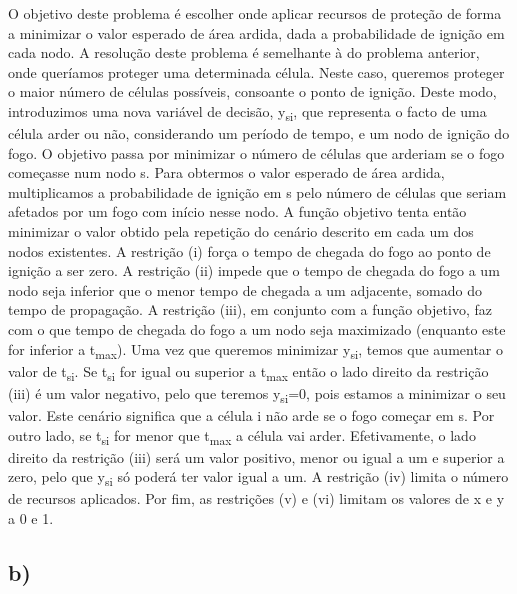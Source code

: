 \documentclass[11pt]{article} %
\begin{document}
O objetivo deste problema é escolher onde aplicar recursos de proteção de forma a minimizar o valor esperado de área ardida, dada a probabilidade de ignição em cada nodo. A resolução deste problema é semelhante à do problema anterior, onde queríamos proteger uma determinada célula. Neste caso, queremos proteger o maior número de células possíveis, consoante o ponto de ignição. Deste modo, introduzimos uma nova variável de decisão, y\textsubscript{si}, que representa o facto de uma célula arder ou não, considerando um período de tempo, e um nodo de ignição do fogo. O objetivo passa por minimizar  o número de células que arderiam se o fogo começasse num nodo s.
Para obtermos o valor esperado de área ardida, multiplicamos a probabilidade de ignição em s pelo número de células que seriam afetados por um fogo com início nesse nodo. A função objetivo tenta então minimizar o valor obtido pela repetição do cenário descrito em cada um dos nodos existentes. A restrição (i) força o tempo de chegada do fogo ao ponto de ignição a ser zero. A restrição (ii) impede que o tempo de chegada do fogo a um nodo seja inferior que o menor tempo de chegada a um adjacente, somado do tempo de propagação. A restrição (iii), em conjunto com a função objetivo, faz com o que tempo de chegada do fogo a um nodo seja maximizado (enquanto este for inferior a t\textsubscript{max}). Uma vez que queremos minimizar y\textsubscript{si}, temos que aumentar o valor de t\textsubscript{si}. Se  t\textsubscript{si} for igual ou superior a t\textsubscript{max} então o lado direito da restrição (iii) é um valor negativo, pelo que teremos y\textsubscript{si}=0, pois estamos a minimizar o seu valor. Este cenário significa que a célula i não arde se o fogo começar em s. Por outro lado, se t\textsubscript{si} for menor que  t\textsubscript{max} a célula vai arder. Efetivamente, o lado direito da restrição (iii) será um valor positivo, menor ou igual a um e superior a zero, pelo que y\textsubscript{si} só poderá ter valor igual a um. A restrição (iv) limita o número de recursos aplicados. Por fim, as restrições (v) e (vi) limitam os valores de x e y a 0 e 1.
\subsection*{b)}
\end{document}
